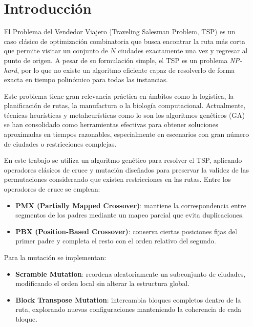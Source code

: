 \section{Introducción}

El Problema del Vendedor Viajero (Traveling Salesman Problem, TSP) es un caso clásico de optimización combinatoria que busca encontrar la ruta más corta que permite visitar un conjunto de \( N \) ciudades exactamente una vez y regresar al punto de origen.
A pesar de su formulación simple, el TSP es un problema \textit{NP-hard}, por lo que no existe un algoritmo eficiente capaz de resolverlo de forma exacta en tiempo polinómico para todas las instancias. 

Este problema tiene gran relevancia práctica en ámbitos como la logística, la planificación de rutas, la manufactura o la biología computacional. Actualmente, técnicas heurísticas y metaheurísticas como lo son los algoritmos genéticos (GA) se han consolidado como herramientas efectivas para obtener soluciones aproximadas en tiempos razonables, especialmente en escenarios con gran número de ciudades o restricciones complejas.

En este trabajo se utiliza un algoritmo genético para resolver el TSP, aplicando operadores clásicos de cruce y mutación diseñados para preservar la validez de las permutaciones considerando que existen restricciones en las rutas. Entre los operadores de cruce se emplean:
\begin{itemize}\label{intro pmx/pbx}
    \item \textbf{PMX (Partially Mapped Crossover)}: mantiene la correspondencia entre segmentos de los padres mediante un mapeo parcial que evita duplicaciones.
    \item \textbf{PBX (Position-Based Crossover)}: conserva ciertas posiciones fijas del primer padre y completa el resto con el orden relativo del segundo.
\end{itemize}

Para la mutación se implementan:
\begin{itemize}
    \item \textbf{Scramble Mutation}: reordena aleatoriamente un subconjunto de ciudades, modificando el orden local sin alterar la estructura global.
    \item \textbf{Block Transpose Mutation}: intercambia bloques completos dentro de la ruta, explorando nuevas configuraciones manteniendo la coherencia de cada bloque.
\end{itemize}

